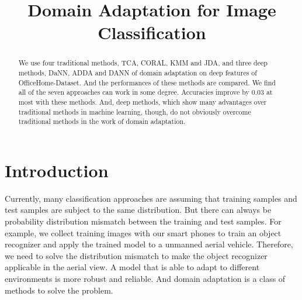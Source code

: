 \documentclass[conference]{IEEEtran}
\begin{document}
\title{Domain Adaptation for Image Classification\\
}

\author{
\and
{}
\and
{}
}

\maketitle

\begin{abstract}
We use four traditional methods, TCA, CORAL, KMM and JDA, and three deep methods, DaNN, ADDA and DANN of domain adaptation on deep features of OfficeHome-Dataset. And the performances of these methods are compared. We find all of the seven approaches can work in some degree. Accuracies improve by 0.03 at most with these methods. And, deep methods, which show many advantages over traditional methods in machine learning, though, do not obviously overcome traditional methods in the work of domain adaptation.
\end{abstract}



\section{Introduction}
Currently, many classification approaches are assuming that training samples and test samples are subject to the same distribution. But there can always be probability distribution mismatch between the training and test samples. For example, we collect training images with our smart phones to train an object recognizer and apply the trained model to a unmanned aerial vehicle. Therefore, we need to solve the distribution mismatch to make the object recognizer applicable in the aerial view. A model that is able to adapt to different environments is more robust and reliable. And domain adaptation is a class of methods to solve the problem.
\end{document}
